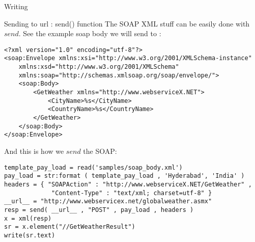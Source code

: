 \begin{section}{Writing}
\begin{subsection}{Sending to url : send() function}
The SOAP XML stuff can be easily done with $send$.
See the example soap body we  will send to :

\begin{lstlisting}[style=xmlStyle]
<?xml version="1.0" encoding="utf-8"?>
<soap:Envelope xmlns:xsi="http://www.w3.org/2001/XMLSchema-instance" 
	xmlns:xsd="http://www.w3.org/2001/XMLSchema" 
	xmlns:soap="http://schemas.xmlsoap.org/soap/envelope/">
    <soap:Body>
        <GetWeather xmlns="http://www.webserviceX.NET">
            <CityName>%s</CityName>
            <CountryName>%s</CountryName>
        </GetWeather>
    </soap:Body>
</soap:Envelope>
\end{lstlisting}

And this is how we $send$ the SOAP: 

\begin{lstlisting}[style=JexlStyle]
template_pay_load = read('samples/soap_body.xml')
pay_load = str:format ( template_pay_load , 'Hyderabad', 'India' )
headers = { "SOAPAction" : "http://www.webserviceX.NET/GetWeather" , 
             "Content-Type" : "text/xml; charset=utf-8" }
__url__ = "http://www.webservicex.net/globalweather.asmx"
resp = send( __url__ , "POST" , pay_load , headers ) 
x = xml(resp)
sr = x.element("//GetWeatherResult")
write(sr.text)
\end{lstlisting}
\end{subsection}

\end{section}


